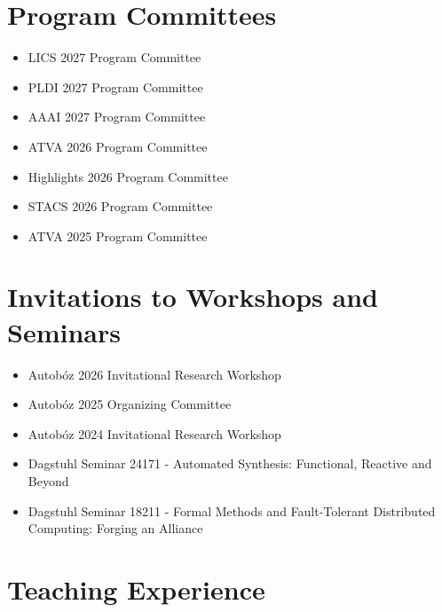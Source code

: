 \documentclass[11pt,a4paper,sans]{moderncv}        %
\begin{document}


\section{Program Committees}

\begin{itemize}
	\setlength\itemsep{2pt}
	\item LICS 2027 Program Committee
	\item PLDI 2027 Program Committee
	\item AAAI 2027 Program Committee
	\item ATVA 2026 Program Committee
	\item Highlights 2026 Program Committee
	\item STACS 2026 Program Committee
	\item ATVA 2025 Program Committee
\end{itemize}



\section{Invitations to Workshops and Seminars}

\begin{itemize}
	\setlength\itemsep{2pt}
	\item Autobóz 2026 Invitational Research Workshop
	\item Autobóz 2025 Organizing Committee
	\item Autobóz 2024 Invitational Research Workshop
	\item Dagstuhl Seminar 24171 - Automated Synthesis: Functional, Reactive and Beyond
	\item Dagstuhl Seminar 18211 -  Formal Methods and Fault-Tolerant Distributed Computing: Forging an Alliance	
\end{itemize}



\section{Teaching Experience}
\end{document}
